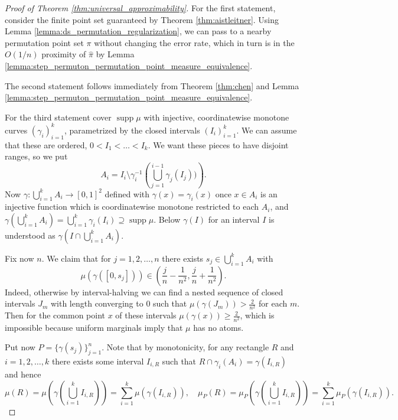 \documentclass{article}
\newcommand{\supp}{\mathop{\mathrm{supp}}}
\theoremstyle{definition}
\begin{document}
\begin{proof}[Proof of Theorem \ref{thm:universal_approximability}]
    For the first statement, consider the finite point set guaranteed by Theorem \ref{thm:aistleitner}. Using Lemma \ref{lemma:ds_permutation_regularization}, we can pass to a nearby permutation point set $\pi$ without changing the error rate, which in turn is in the $O(1/n)$ proximity of $\widehat{\pi}$ by Lemma \ref{lemma:step_permuton_permutation_point_measure_equivalence}. 

    The second statement follows immediately from Theorem \ref{thm:chen} and Lemma \ref{lemma:step_permuton_permutation_point_measure_equivalence}.

    For the third statement cover $\supp \mu$ with injective, coordinatewise monotone curves $(\gamma_i)_{i=1}^{k}$, parametrized by the closed intervals $(I_i)_{i=1}^k$. We can assume that these are ordered, $0<I_1<\dots <I_k$. We want these pieces to have disjoint ranges, so we put
    $$A_i = I_i \setminus \gamma_i^{-1}\left(\bigcup_{j=1}^{i-1}\gamma_j(I_j))\right).$$
    Now $\gamma:\bigcup_{i=1}^{k} A_i\to[0, 1]^2$ defined with $\gamma(x)=\gamma_i(x)$ once $x\in A_i$ is an injective function which is coordinatewise monotone restricted to each $A_i$, and $\gamma(\bigcup_{i=1}^{k}A_i)=\bigcup_{i=1}^{k}\gamma_i(I_i)\supseteq \supp \mu$. Below $\gamma(I)$ for an interval $I$ is understood as $\gamma(I\cap \bigcup_{i=1}^{k}A_i)$.

    Fix now $n$. 
    We claim that for $j=1, 2, \dots, n$ there exists $s_j \in \bigcup_{i=1}^{k}A_i$ with
    $$\mu(\gamma([0, s_j]))\in \left(\frac{j}{n}-\frac{1}{n^2}, \frac{j}{n}+\frac{1}{n^2}\right).$$
    Indeed, otherwise by interval-halving we can find a nested sequence of closed intervals $J_m$ with length converging to 0 such that $\mu(\gamma(J_m))>\frac{2}{n^2}$ for each $m$. Then for the common point $x$ of these intervals $\mu(\gamma(x))\geq \frac{2}{n^2}$, which is impossible because uniform marginals imply that $\mu$ has no atoms.

    Put now $P=\{\gamma(s_j)\}_{j=1}^n$. Note that by monotonicity, for any rectangle $R$ and $i=1, 2, \dots, k$ there exists some interval $I_{i, R}$ such that $R\cap \gamma_i(A_i)=\gamma(I_{i, R})$ and hence $$\mu(R)=\mu\left(\gamma\left(\bigcup_{i=1}^k I_{i, R}\right)\right)=\sum_{i=1}^{k}\mu(\gamma(I_{i, R})), \quad\mu_P(R)=\mu_P\left(\gamma\left(\bigcup_{i=1}^k I_{i, R}\right)\right)=\sum_{i=1}^{k}\mu_P(\gamma(I_{i, R})).$$


\end{proof}
\end{document}
